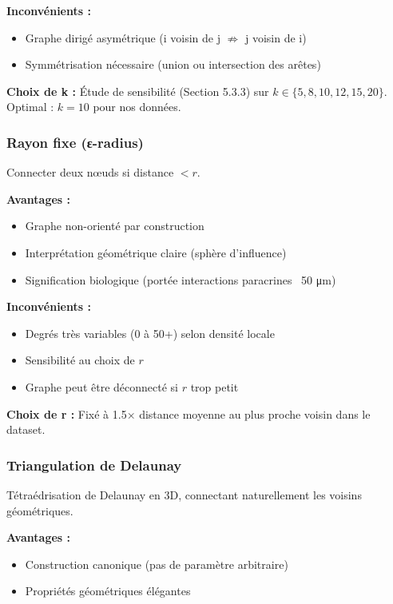 \textbf{Inconvénients :}
\begin{itemize}
    \item Graphe dirigé asymétrique (i voisin de j $\not\Rightarrow$ j voisin de i)
    \item Symmétrisation nécessaire (union ou intersection des arêtes)
\end{itemize}

\textbf{Choix de k :}
Étude de sensibilité (Section 5.3.3) sur $k \in \{5, 8, 10, 12, 15, 20\}$. Optimal : $k = 10$ pour nos données.

\subsubsection{Rayon fixe (ε-radius)}

Connecter deux nœuds si distance $< r$.

\textbf{Avantages :}
\begin{itemize}
    \item Graphe non-orienté par construction
    \item Interprétation géométrique claire (sphère d'influence)
    \item Signification biologique (portée interactions paracrines ~50 μm)
\end{itemize}

\textbf{Inconvénients :}
\begin{itemize}
    \item Degrés très variables (0 à 50+) selon densité locale
    \item Sensibilité au choix de $r$
    \item Graphe peut être déconnecté si $r$ trop petit
\end{itemize}

\textbf{Choix de r :}
Fixé à 1.5× distance moyenne au plus proche voisin dans le dataset.

\subsubsection{Triangulation de Delaunay}

Tétraédrisation de Delaunay en 3D, connectant naturellement les voisins géométriques.

\textbf{Avantages :}
\begin{itemize}
    \item Construction canonique (pas de paramètre arbitraire)
    \item Propriétés géométriques élégantes
\end{itemize}

